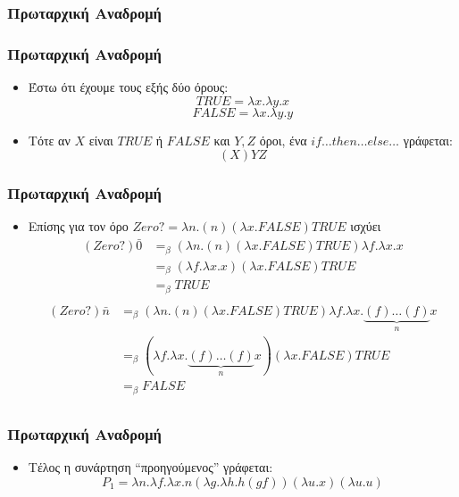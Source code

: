 \documentclass{beamer}
\begin{document}
\subsubsection{Πρωταρχική Αναδρομή}

\begin{frame}
  \frametitle{Πρωταρχική Αναδρομή}
  \begin{itemize}
  \item Έστω ότι έχουμε τους εξής δύο όρους:
    $$ TRUE = \lambda x. \lambda y. x $$
    $$ FALSE = \lambda x. \lambda y. y $$
    \pause
  \item Τότε αν $X$ είναι $TRUE$ ή $FALSE$ και $Y,Z$ όροι, ένα
    $if\ldots then \ldots else \ldots$ γράφεται:
    $$ (X)YZ $$
  \end{itemize}
\end{frame}

\begin{frame}
  \frametitle{Πρωταρχική Αναδρομή}
  \begin{itemize}
  \item Επίσης για τον όρο $Zero? = \lambda n. (n) (\lambda x . FALSE)
    TRUE$ ισχύει \pause
    $$
    \begin{array}{ll}
      (Zero?) \bar{0} & =_\beta (\lambda n. (n) (\lambda x . FALSE)
      TRUE) \lambda f. \lambda x. x \\
      & =_\beta (\lambda f. \lambda x. x) (\lambda x . FALSE) TRUE \\
      & =_\beta TRUE \\
    \end{array}
    $$                
    \pause
    $$
    \begin{array}{ll}
      (Zero?) \bar{n} & =_\beta (\lambda n. (n) (\lambda x . FALSE)
      TRUE) \lambda f . \lambda x . \underbrace{(f) \ldots (f)}_n x \\
      & =_\beta (\lambda f . \lambda x . \underbrace{(f) \ldots (f)}_n
      x) (\lambda x . FALSE) TRUE \\ & =_\beta FALSE \\
    \end{array}
    $$                
  \end{itemize}
\end{frame}

\begin{frame}
  \frametitle{Πρωταρχική Αναδρομή}
  \begin{itemize}
  \item Τέλος η συνάρτηση ``προηγούμενος'' γράφεται:
    $$ P_1 = \lambda n. \lambda f. \lambda x. n (\lambda g. \lambda
    h. h (g f)) (\lambda u.x) (\lambda u. u) $$
  \end{itemize}
\end{frame}
\end{document}
